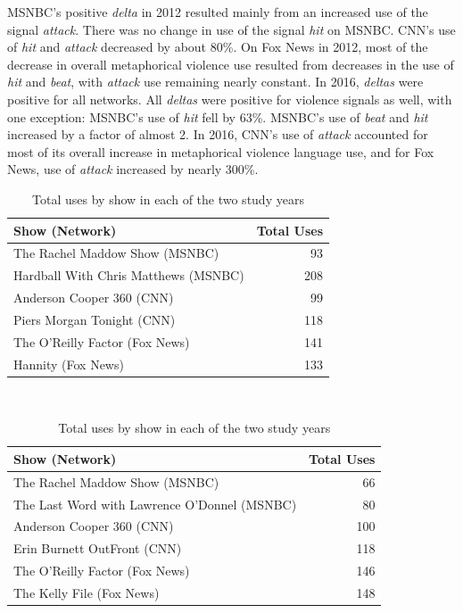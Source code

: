 MSNBC's positive \emph{delta} in 2012 resulted mainly
from an increased use of the signal \emph{attack}. There was no change in use of
the signal \emph{hit} on MSNBC. CNN's use of \emph{hit} and \emph{attack}
decreased by about 80\%. On Fox News in 2012, most of the decrease in overall
metaphorical violence use resulted from decreases in the use of \emph{hit} and
\emph{beat}, with \emph{attack} use remaining nearly constant. In 2016,
\emph{deltas} were positive for all networks. All \emph{deltas} were positive
for violence signals as well, with one exception: MSNBC's use of \emph{hit} fell
by 63\%. MSNBC's use of \emph{beat} and \emph{hit} increased by a factor of
almost 2. In 2016, CNN's use of \emph{attack} accounted for most of its overall
increase in metaphorical violence language use, and for Fox News, use of
\emph{attack} increased by nearly 300\%. 

\begin{table}
  \centering
  \bgroup
    \begin{subtable}{\textwidth}
      \centering
      \begin{tabular}{lr}
        \toprule
        Show (Network) & Total Uses \\
        \midrule
        The Rachel Maddow Show (MSNBC) & 93 \\
        Hardball With Chris Matthews (MSNBC) & 208 \\
        Anderson Cooper 360 (CNN) & 99 \\
        Piers Morgan Tonight (CNN) & 118 \\
        The O'Reilly Factor (Fox News) & 141 \\
        Hannity (Fox News) & 133 \\
        \bottomrule
      \end{tabular}
      \caption{Total number of uses metaphorical violence language by news show in 2012}
      \label{tab:by-show-2012}
    \end{subtable} \\  \vspace{1.5em}
    \begin{subtable}{\textwidth}
      \centering
      \begin{tabular}{lr}
        \toprule
        Show (Network) & Total Uses \\
        \midrule
        The Rachel Maddow Show (MSNBC) & 66 \\
        The Last Word with Lawrence O'Donnel (MSNBC) & 80 \\
        Anderson Cooper 360 (CNN) & 100 \\
        Erin Burnett OutFront (CNN) & 118 \\
        The O'Reilly Factor (Fox News) & 146 \\
        The Kelly File (Fox News) & 148 \\
        \bottomrule
      \end{tabular} \quad
      \caption{Total number of uses metaphorical violence language by news show in 2016}
      \label{tab:by-show-2016}
    \end{subtable}
  \egroup
  \caption{Total uses by show in each of the two study years}
  \label{tab:by-show}
\end{table}

